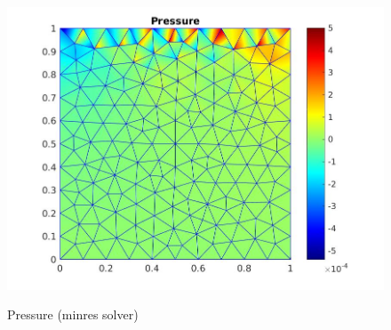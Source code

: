 \documentclass[a4paper]{book}
\begin{document}
\begin{figure}
\begin{minipage}[c]{0.3\textwidth}
  \end{minipage}
  \begin{minipage}[c]{0.67\textwidth}
    \includegraphics[width=\textwidth]{lid_minres_pressure.jpg}
  \end{minipage}\hfill
  \begin{minipage}[c]{0.3\textwidth}
    \caption{Pressure (minres solver)} \label{pressure_stoke_minres_lid}
  \end{minipage}
\caption{\label{stoke_minres_lid}}
\end{figure}
\end{document}
